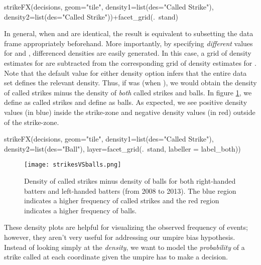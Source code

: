 \begin{article}
\begin{Schunk}
\begin{Sinput}
strikeFX(decisions, geom="tile", density1=list(des="Called Strike"), 
	density2=list(des="Called Strike"))+facet_grid(.~stand) 
\end{Sinput}
\end{Schunk}


In general, when  and  are identical,
the result is equivalent to subsetting the data frame appropriately
beforehand. More importantly, by specifying \emph{different} values
for  and , differenced densities are
easily generated. In this case, a grid of density estimates for 
are subtracted from the corresponding grid of density estimates for
. Note that the default  value for either
density option infers that the entire data set defines the relevant
density. Thus, if  was  (when ),
we would obtain the density of called strikes minus the density of
\emph{both} called strikes and balls. In figure \ref{fig:strikesVSballs},
we define  as called strikes and define 
as balls. As expected, we see positive density values (in blue) inside
the strike-zone and negative density values (in red) outside of the
strike-zone. 

\begin{Schunk}
\begin{Sinput}
strikeFX(decisions, geom="tile", density1=list(des="Called Strike"), 
	density2=list(des="Ball"), layer=facet_grid(.~stand, labeller = label_both)) 
\end{Sinput}
\end{Schunk}


\begin{figure}[h]
\centerline{\texttt{[image: strikesVSballs.png]}}

\caption{\label{fig:strikesVSballs} Density of called strikes minus density
of balls for both right-handed batters and left-handed batters (from
2008 to 2013). The blue region indicates a higher frequency of called
strikes and the red region indicates a higher frequency of balls.}
\end{figure}


These density plots are helpful for visualizing the observed frequency
of events; however, they aren't very useful for addressing our umpire
bias hypothesis. Instead of looking simply at the \emph{density},
we want to model the \emph{probability} of a strike called at each
coordinate given the umpire has to make a decision. 



\end{article}
